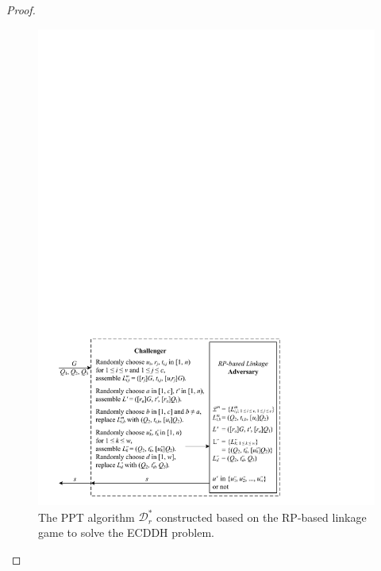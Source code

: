 \begin{theorem}
\begin{proof}
  \begin{figure}[tb]
    \centering
    \includegraphics[width=1.0\linewidth]{fig/rp-linkage-game.pdf}
    \caption{The PPT algorithm $\mathcal{D}^*_r$ constructed based on the RP-based linkage game to solve the ECDDH problem.}
    \label{fig:dalgorithm}
  \end{figure}



\end{proof}
\end{theorem}
